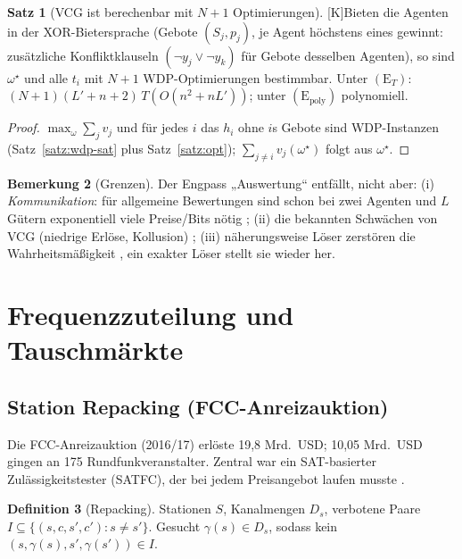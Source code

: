\documentclass[a4paper,12pt]{article}
\theoremstyle{definition}
\newtheorem{definition}{Definition}[section]
\newtheorem{satz}[definition]{Satz}
\newtheorem{bemerkung}[definition]{Bemerkung}
\newcommand{\tK}{\textsf{\small[K]}}   %
\newcommand{\Epoly}{(\mathrm{E}_{\mathrm{poly}})}
\newcommand{\ET}{(\mathrm{E}_{T})}
\begin{document}
\begin{satz}[VCG ist berechenbar mit \(N+1\) Optimierungen]\tK\label{satz:vcg-comp}
Bieten die Agenten in der XOR-Bietersprache (Gebote \((S_j,p_j)\), je Agent höchstens eines gewinnt: zusätzliche Konfliktklauseln \((\neg y_j\vee\neg y_k)\) für Gebote desselben Agenten), so sind \(\omega^\star\) und alle \(t_i\) mit \(N+1\) WDP-Optimierungen bestimmbar. Unter \(\ET\): \((N+1)(L'+n+2)\,T(O(n^2+nL'))\); unter \(\Epoly\) polynomiell.
\end{satz}
\begin{proof}
\(\max_\omega\sum_jv_j\) und für jedes \(i\) das \(h_i\) ohne \(i\)s Gebote sind WDP-Instanzen (Satz~\ref{satz:wdp-sat} plus Satz~\ref{satz:opt}); \(\sum_{j\ne i}v_j(\omega^\star)\) folgt aus \(\omega^\star\).
\end{proof}

\begin{bemerkung}[Grenzen]\label{bem:vcg-limits}
Der Engpass „Auswertung“ entfällt, nicht aber: (i) \emph{Kommunikation}: für allgemeine Bewertungen sind schon bei zwei Agenten und \(L\) Gütern exponentiell viele Preise/Bits nötig \cite{nisansegal2006}; (ii) die bekannten Schwächen von VCG (niedrige Erlöse, Kollusion) \cite{ausubelmilgrom2006}; (iii) näherungsweise Löser zerstören die Wahrheitsmäßigkeit \cite{nisanronen2001}, ein exakter Löser stellt sie wieder her.
\end{bemerkung}

\section{Frequenzzuteilung und Tauschmärkte}
\label{eco:matching}

\subsection{Station Repacking (FCC-Anreizauktion)}
Die FCC-Anreizauktion (2016/17) erlöste 19,8 Mrd.\ USD; 10,05 Mrd.\ USD gingen an 175 Rundfunkveranstalter. Zentral war ein SAT-basierter Zulässigkeitstester (SATFC), der bei jedem Preisangebot laufen musste \cite{newman2018,frechette2016}.

\begin{definition}[Repacking]
Stationen \(S\), Kanalmengen \(D_s\), verbotene Paare \(I\subseteq\{(s,c,s',c'): s\ne s'\}\). Gesucht \(\gamma(s)\in D_s\), sodass kein \((s,\gamma(s),s',\gamma(s'))\in I\).
\end{definition}
\end{document}
